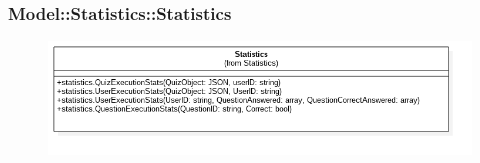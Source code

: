 \subsubsection{Model::Statistics::Statistics}
\begin{figure}[h!]
\begin{center}
	\includegraphics[scale=0.4]{../images/Model/Statistics/Statistics.png}
\end{center}
\end{figure}
